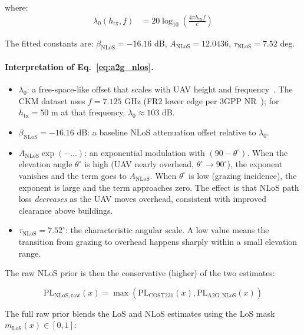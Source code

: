 \documentclass[11pt,a4paper]{article}
\begin{document}
where:
\begin{align}
\lambda_0(h_{\mathrm{tx}}, f)
&= 20\log_{10}\!\left(\frac{4\pi h_{\mathrm{tx}} f}{c}\right)
\label{eq:lambda0}
\end{align}

The fitted constants are:
$\beta_{\mathrm{NLoS}} = -16.16$ dB,
$A_{\mathrm{NLoS}} = 12.0436$,
$\tau_{\mathrm{NLoS}} = 7.52$ deg.

\paragraph{Interpretation of Eq.~\eqref{eq:a2g_nlos}.}
\begin{itemize}
\item $\lambda_0$: a free-space-like offset that scales with UAV height and
      frequency~\cite{khawaja_survey,wocc2021}. The CKM dataset uses
      $f = 7.125$ GHz (FR2 lower edge per 3GPP NR~\cite{tr38901}); for
      $h_{\mathrm{tx}} = 50$ m at that frequency, $\lambda_0 \approx 103$ dB.
\item $\beta_{\mathrm{NLoS}} = -16.16$ dB: a baseline NLoS attenuation
      offset relative to $\lambda_0$.
\item $A_{\mathrm{NLoS}}\exp(-\ldots)$: an exponential modulation with
      $(90 - \theta^\circ)$. When the elevation angle $\theta^\circ$ is high
      (UAV nearly overhead, $\theta^\circ \to 90^\circ$), the exponent
      vanishes and the term goes to $A_{\mathrm{NLoS}}$. When $\theta^\circ$
      is low (grazing incidence), the exponent is large and the term
      approaches zero. The effect is that NLoS path loss \emph{decreases} as
      the UAV moves overhead, consistent with improved clearance above
      buildings.
\item $\tau_{\mathrm{NLoS}} = 7.52^\circ$: the characteristic angular scale.
      A low value means the transition from grazing to overhead happens
      sharply within a small elevation range.
\end{itemize}

The raw NLoS prior is then the conservative (higher) of the two estimates:

\begin{equation}
\mathrm{PL}_{\mathrm{NLoS,raw}}(x)
=
\max\left(
\mathrm{PL}_{\mathrm{COST231}}(x),
\mathrm{PL}_{\mathrm{A2G,NLoS}}(x)
\right)
\label{eq:nlos_raw}
\end{equation}

The full raw prior blends the LoS and NLoS estimates using the LoS mask
$m_{\mathrm{LoS}}(x) \in [0,1]$:
\end{document}
